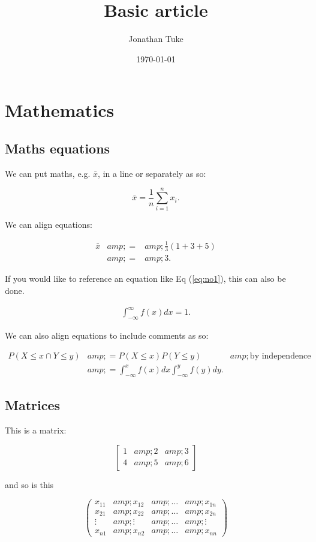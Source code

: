 \documentclass[11pt]{article}
\title{Basic article}
\author{Jonathan Tuke}
\date{\today}
\begin{document}
\maketitle

\tableofcontents

\section{Mathematics}
\subsection{Maths equations}
We can put maths, e.g. $\bar{x}$, in a line or separately as so:

$$
    \bar{x}=\frac{1}{n}\sum^n_{i=1}x_i.
$$

We can align equations:

\begin{eqnarray*}
\bar{x}&amp;=&amp;\frac 13\left(1+3+5\right)\\
&amp;=&amp;3.
\end{eqnarray*}

If you would like to reference an equation like Eq (\ref{eq:no1}), this can also be done.

\begin{eqnarray}
\int^{\infty}_{-\infty}f(x) dx=1.\label{eq:no1}
\end{eqnarray}

We can also align equations to include comments as so:

\begin{align*}
    P(X\leq x \cap Y\leq y)    &amp;= P(X\leq x)P(Y\leq y)&amp;\text{by independence}\\
    &amp;=\int_{-\infty}^{x}f(x)dx \int_{-\infty}^{y}f(y)dy.
\end{align*}

\subsection{Matrices}
This is a matrix:

$$
\begin{bmatrix}
    1&amp;2&amp;3\\
    4&amp;5&amp;6
\end{bmatrix}
$$

and so is this

$$
\begin{pmatrix}
    x_{11} &amp; x_{12} &amp; \ldots &amp; x_{1n}\\
    x_{21} &amp; x_{22} &amp; \ldots &amp; x_{2n}\\
    \vdots &amp; \vdots &amp; \ldots &amp; \vdots\\
    x_{n1} &amp; x_{n2} &amp; \ldots &amp; x_{nn}
\end{pmatrix}
$$
\end{document}
